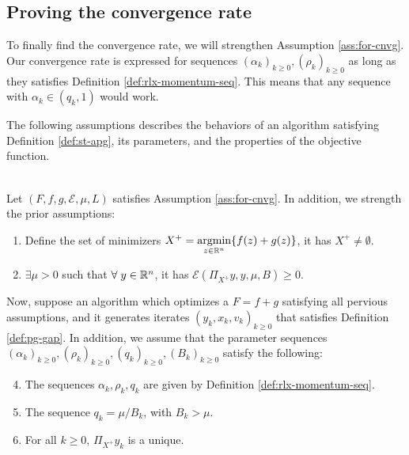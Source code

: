\documentclass[12pt]{article}
\begin{document}
    \subsection{Proving the convergence rate}
        To finally find the convergence rate, we will strengthen Assumption \ref{ass:for-cnvg}. 
        Our convergence rate is expressed for sequences $(\alpha_k)_{k \ge 0}, (\rho_k)_{k\ge0}$ as long as they satisfies Definition \ref{def:rlx-momentum-seq}. 
        This means that any sequence with $\alpha_k \in (q_k, 1)$ would work. 
        \par
        The following assumptions describes the behaviors of an algorithm satisfying Definition \ref{def:st-apg}, its parameters, and the properties of the objective function. 
        \begin{assumption}\;\label{ass:lin-cnvg}\\
            Let $(F, f, g, \mathcal E, \mu, L)$ satisfies Assumption \ref{ass:for-cnvg}. 
            In addition, we strength the prior assumptions:
            \begin{enumerate}[nosep]
                \item Define the set of minimizers $X^+ = \mathop{\rm argmin}\limits_{z\in \mathbb R^n}\{ f(z) + g(z)\}$, it has $X^+ \neq \emptyset$. 
                \item $\exists \mu > 0$ such that $\forall\; y \in \mathbb R^n$, it has $\mathcal E \left(\Pi_{X^+}y, y, \mu, B\right) \ge 0$. 
            \end{enumerate}
            Now, suppose an algorithm which optimizes a $F = f + g$ satisfying all pervious assumptions, and it generates iterates $(y_k, x_k, v_k)_{k\ge 0}$ that satisfies Definition \ref{def:pg-gap}. 
            In addition, we assume that the parameter sequences $(\alpha_k)_{k \ge 0}, (\rho_k)_{k \ge 0}, (q_k)_{k \ge 0}, (B_k)_{k \ge 0}$ satisfy the following: 
            \begin{enumerate}[nosep]\setcounter{enumi}{3}
                \item The sequences $\alpha_k, \rho_k, q_k$ are given by Definition \ref{def:rlx-momentum-seq}. 
                \item The sequence $q_k = \mu/B_k$, with $B_k > \mu$. 
                \item For all $k \ge 0$, $\Pi_{X^+}y_k$ is a unique. 
            \end{enumerate}
        \end{assumption}
        \begin{assumption}
            
        \end{assumption}
\end{document}
